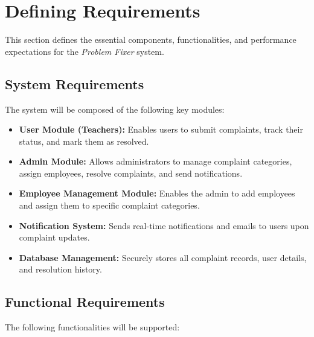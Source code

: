 \documentclass[a4paper,12pt]{article}
\begin{document}
\newpage
\section{Defining Requirements}

This section defines the essential components, functionalities, and performance expectations for the \textit{Problem Fixer} system.

\subsection{System Requirements}

The system will be composed of the following key modules:

\begin{itemize}
\item \textbf{User Module (Teachers):} Enables users to submit complaints, track their status, and mark them as resolved.
\item \textbf{Admin Module:} Allows administrators to manage complaint categories, assign employees, resolve complaints, and send notifications.
\item \textbf{Employee Management Module:} Enables the admin to add employees and assign them to specific complaint categories.
\item \textbf{Notification System:} Sends real-time notifications and emails to users upon complaint updates.
\item \textbf{Database Management:} Securely stores all complaint records, user details, and resolution history.
\end{itemize}

\subsection{Functional Requirements}

The following functionalities will be supported:
\end{document}
